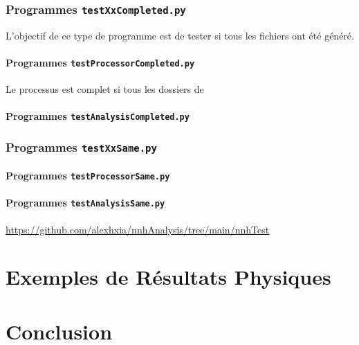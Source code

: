 \documentclass[10pt,a4paper]{report}
\begin{document}
\subsection{Programmes \texttt{testXxCompleted.py}}

L'objectif de ce type de programme est de tester si tous les fichiers ont été généré.

\subsubsection{Programmes \texttt{testProcessorCompleted.py}}

Le processus est complet si tous les dossiers de 

\subsubsection{Programmes \texttt{testAnalysisCompleted.py}}


\subsection{Programmes \texttt{testXxSame.py}}

\subsubsection{Programmes \texttt{testProcessorSame.py}}

\subsubsection{Programmes \texttt{testAnalysisSame.py}}



\url{https://github.com/alexhxia/nnhAnalysis/tree/main/nnhTest}


\chapter{Exemples de Résultats Physiques}

\chapter{Conclusion}


\end{document}
